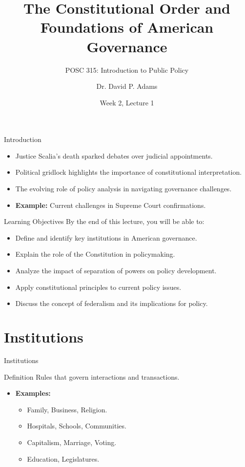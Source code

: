 \documentclass[12pt]{beamer}
\begin{document}
\title{The Constitutional Order and Foundations of American Governance}
\subtitle{POSC 315: Introduction to Public Policy}
\author{Dr. David P. Adams}
\date{Week 2, Lecture 1}

\begin{frame}
    \titlepage
\end{frame}

\begin{frame}{Introduction}
    \begin{itemize}
        \item Justice Scalia's death sparked debates over judicial appointments.
        \item Political gridlock highlights the importance of constitutional interpretation.
        \item The evolving role of policy analysis in navigating governance challenges.
        \item \textbf{Example:} Current challenges in Supreme Court confirmations.
    \end{itemize}
\end{frame}

\begin{frame}{Learning Objectives}
    By the end of this lecture, you will be able to:
    \begin{itemize}
        \item Define and identify key institutions in American governance.
        \item Explain the role of the Constitution in policymaking.
        \item Analyze the impact of separation of powers on policy development.
        \item Apply constitutional principles to current policy issues.
        \item Discuss the concept of federalism and its implications for policy.
    \end{itemize}
\end{frame}

\section{Institutions}
\begin{frame}{Institutions}
    \begin{block}{Definition}
        Rules that govern interactions and transactions.
    \end{block}
    \begin{itemize}
        \item \textbf{Examples:}
        \begin{itemize}
            \item Family, Business, Religion.
            \item Hospitals, Schools, Communities.
            \item Capitalism, Marriage, Voting.
            \item Education, Legislatures.
        \end{itemize}
    \end{itemize}
\end{frame}
\end{document}
